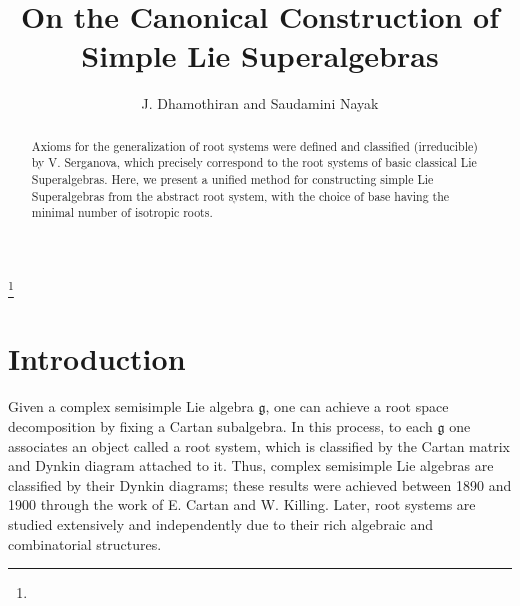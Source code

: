 \documentclass[11pt]{amsart}
\theoremstyle{plain}
\theoremstyle{definition}
\numberwithin{equation}{section}
\newcommand{\g}{\mathfrak{g}}
\begin{document}
	
	\title{On the Canonical Construction of Simple Lie Superalgebras}
	
	\author{J. Dhamothiran and Saudamini Nayak}
	\address{ Department of Mathematics, National Institute of Technology Calicut, NIT Campus P.O., Kozhikode-673 601, India}
	\address{ Department of Mathematics, National Institute of Technology Calicut, NIT Campus P.O., Kozhikode-673 601, India}
	
	
	
	\thanks{}
	
	
	\begin{abstract}
	Axioms for the generalization of root systems were defined and classified (irreducible) by V. Serganova, which precisely correspond to the root systems of basic classical Lie Superalgebras. Here, we present a unified method for constructing simple Lie Superalgebras from the abstract root system, with the choice of base having the minimal number of isotropic roots.	
	\end{abstract}
	
	
	\maketitle
	\thispagestyle{empty}
	
	\setcounter{tocdepth}{1}
	
	
	\section{Introduction}
	
	Given a complex semisimple Lie algebra $\g$, one can achieve a root space decomposition by fixing a Cartan subalgebra. In this process, to each $\g$ one associates an object called a root system, which is classified by the Cartan matrix and Dynkin diagram attached to it. Thus, complex semisimple Lie algebras are classified by their Dynkin diagrams; these results were achieved between 1890 and 1900 through the work of E. Cartan and W. Killing. Later, root systems are studied extensively and independently due to their rich algebraic and combinatorial structures.
	
\end{document}

